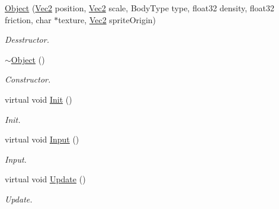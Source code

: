 \begin{DoxyCompactItemize}
\item 
\mbox{\label{class_object_afc4b53523e4e9eb092779843a27268b7}} 
\hyperlink{class_object_afc4b53523e4e9eb092779843a27268b7}{Object} (\hyperlink{struct_vec2}{Vec2} position, \hyperlink{struct_vec2}{Vec2} scale, Body\+Type type, float32 density, float32 friction, char $\ast$texture, \hyperlink{struct_vec2}{Vec2} sprite\+Origin)
\begin{DoxyCompactList}\small\item\em Desstructor. \end{DoxyCompactList}\item 
\mbox{\label{class_object_ae8f5483f459e46687bd01e6f9977afd3}} 
\hyperlink{class_object_ae8f5483f459e46687bd01e6f9977afd3}{$\sim$\+Object} ()
\begin{DoxyCompactList}\small\item\em Constructor. \end{DoxyCompactList}\item 
\mbox{\label{class_object_a6e723beba2c9606ab36f1f3674a9537b}} 
virtual void \hyperlink{class_object_a6e723beba2c9606ab36f1f3674a9537b}{Init} ()
\begin{DoxyCompactList}\small\item\em Init. \end{DoxyCompactList}\item 
\mbox{\label{class_object_a5a3159b7d5a34c17b9153d72b92ab86d}} 
virtual void \hyperlink{class_object_a5a3159b7d5a34c17b9153d72b92ab86d}{Input} ()
\begin{DoxyCompactList}\small\item\em Input. \end{DoxyCompactList}\item 
\mbox{\label{class_object_a43f83b38b0497fed04842e7894751206}} 
virtual void \hyperlink{class_object_a43f83b38b0497fed04842e7894751206}{Update} ()
\begin{DoxyCompactList}\small\item\em Update. \end{DoxyCompactList}\item 
\mbox{\label{class_object_a0af60ea226dcb885e69483452d34a47a}} 

\end{DoxyCompactItemize}
